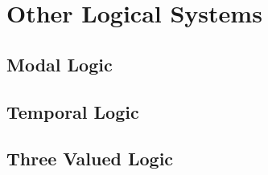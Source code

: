 












\section{Other Logical Systems}

\subsection{Modal Logic}

\subsection{Temporal Logic}

\subsection{Three Valued Logic}

